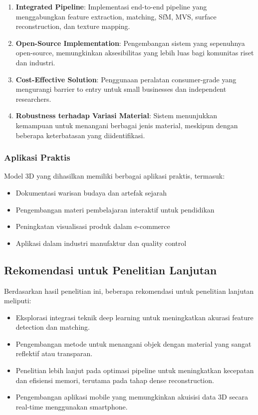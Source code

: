 \documentclass[12pt,a4paper]{article}
\begin{document}
\begin{enumerate}
    \item \textbf{Integrated Pipeline}: Implementasi end-to-end pipeline yang menggabungkan feature extraction, matching, SfM, MVS, surface reconstruction, dan texture mapping.
    \item \textbf{Open-Source Implementation}: Pengembangan sistem yang sepenuhnya open-source, memungkinkan aksesibilitas yang lebih luas bagi komunitas riset dan industri.
    \item \textbf{Cost-Effective Solution}: Penggunaan peralatan consumer-grade yang mengurangi barrier to entry untuk small businesses dan independent researchers.
    \item \textbf{Robustness terhadap Variasi Material}: Sistem menunjukkan kemampuan untuk menangani berbagai jenis material, meskipun dengan beberapa keterbatasan yang diidentifikasi.
\end{enumerate}

\subsubsection{Aplikasi Praktis}
Model 3D yang dihasilkan memiliki berbagai aplikasi praktis, termasuk:
\begin{itemize}
    \item Dokumentasi warisan budaya dan artefak sejarah
    \item Pengembangan materi pembelajaran interaktif untuk pendidikan
    \item Peningkatan visualisasi produk dalam e-commerce
    \item Aplikasi dalam industri manufaktur dan quality control
\end{itemize}

\subsection{Rekomendasi untuk Penelitian Lanjutan}
Berdasarkan hasil penelitian ini, beberapa rekomendasi untuk penelitian lanjutan meliputi:
\begin{itemize}
    \item Eksplorasi integrasi teknik deep learning untuk meningkatkan akurasi feature detection dan matching.
    \item Pengembangan metode untuk menangani objek dengan material yang sangat reflektif atau transparan.
    \item Penelitian lebih lanjut pada optimasi pipeline untuk meningkatkan kecepatan   dan efisiensi memori, terutama pada tahap dense reconstruction.
    \item Pengembangan aplikasi mobile yang memungkinkan akuisisi data 3D secara real-time menggunakan smartphone.
\end{itemize}
\end{document}
